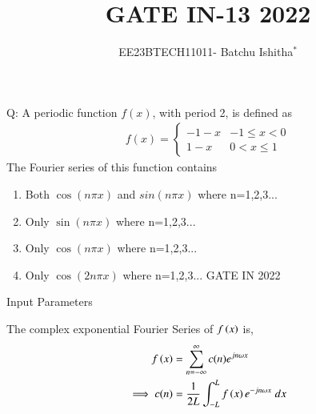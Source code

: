 \documentclass[journal,12pt,onecolumn]{IEEEtran}
\theoremstyle{remark}
\begin{document}
\let\vec\mathbf



\title{ GATE IN-13 2022}
\author{EE23BTECH11011- Batchu Ishitha$^{*}$%
}
\maketitle




\bigskip

\renewcommand{\thefigure}{\theenumi}
\renewcommand{\thetable}{\theenumi}

Q: A periodic function $f(x)$, with period 2, is defined as \\
   \begin{align}   
   f(x) =
   \begin{cases}
    -1-x & -1 \leq x<0 \\
     1-x &  0 <x \leq1 
   \end{cases}
   \end{align} 
   The Fourier series of this function contains \\
\begin{enumerate}[label=\Alph*.]
\item Both $\cos(n\pi x)$ and $sin(n\pi x)$ where n=1,2,3...
\item Only $\sin(n\pi x)$ where n=1,2,3...
\item Only $\cos(n\pi x)$ where n=1,2,3...
\item Only $\cos(2n\pi x)$ where n=1,2,3...  \hfill{GATE IN 2022 }
\end{enumerate} 

\solution
\fi
\begin{table}[!ht]    
    \centering
    
    \caption{Input Parameters}
    \label{table:ishitha.g22.in.13.t1}
\end{table}

The complex exponential Fourier Series of $f\left(x\right)$ is,
\begin{align}
    f\left(x\right)&=\sum_{n=-\infty}^{\infty}c(n)e^{jn\omega x}\\
    \implies c(n)&=\frac{1}{2L}\int_{-L}^{L}f\left(x\right)e^{-jn\omega x}\;dx\\
\end{align}    
\end{document}
